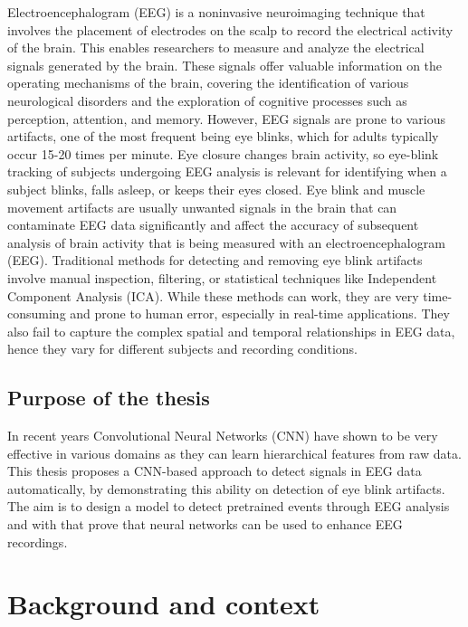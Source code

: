 \documentclass[12pt,a4paper,titlepage,openany]{report}
\begin{document}
Electroencephalogram (EEG) is a noninvasive neuroimaging technique that involves the placement of electrodes on the scalp to record the electrical activity of the brain. This enables researchers to measure and analyze the electrical signals generated by the brain. These signals offer valuable information on the operating mechanisms of the brain, covering the identification of various neurological disorders and the exploration of cognitive processes such as perception, attention, and memory.
However, EEG signals are prone to various artifacts, one of the most frequent being eye blinks, which for adults typically occur 15-20 times per minute. Eye closure changes brain activity, so eye-blink tracking of subjects undergoing EEG analysis is relevant for identifying when a subject blinks, falls asleep, or keeps their eyes closed. 
Eye blink and muscle movement artifacts are usually unwanted signals in the brain that can contaminate EEG data significantly and affect the accuracy of subsequent analysis of brain activity that is being measured with an electroencephalogram (EEG). 
Traditional methods for detecting and removing eye blink artifacts involve manual inspection, filtering, or statistical techniques like Independent Component Analysis (ICA). While these methods can work, they are very time-consuming and prone to human error, especially in real-time applications. They also fail to capture the complex spatial and temporal relationships in EEG data, hence they vary for different subjects and recording conditions.

\section{Purpose of the thesis}

In recent years Convolutional Neural Networks (CNN) have shown to be very effective in various domains as they can learn hierarchical features from raw data. 
This thesis proposes a CNN-based approach to detect signals in EEG data automatically, by demonstrating this ability on detection of eye blink artifacts. 
The aim is to design a model to detect pretrained events through EEG analysis and with that prove that neural networks can be used to enhance EEG recordings.


\chapter{Background and context}
\thispagestyle{fancy}
\end{document}
